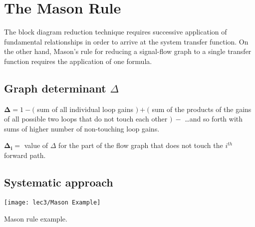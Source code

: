 \section[The Mason Rule]{The Mason Rule}

The block diagram reduction technique requires successive application of fundamental relationships in order to arrive at the system transfer function.
On the other hand, Mason's rule for reducing a signal-flow graph to a single transfer function requires the application of one formula.


\hspace*{\fill}


\subsection[Graph determinant]{Graph determinant $\Delta$}

$\boldsymbol{\Delta} = 1-($ sum of all individual loop gains $)+($ sum of the products of the gains of all
possible two loops that do not touch each other $)\ -$ \ldots and so forth with sums of higher
number of non-touching loop gains.

\justify
$\boldsymbol{\Delta_i} =$ value of $\Delta$ for the part of the flow graph that does not touch the $i^{th}$ forward path.



\subsection{Systematic approach}

\begin{marginfigure}
		\texttt{[image: lec3/Mason Example]}
		\caption{Mason rule example.}
\end{marginfigure}

